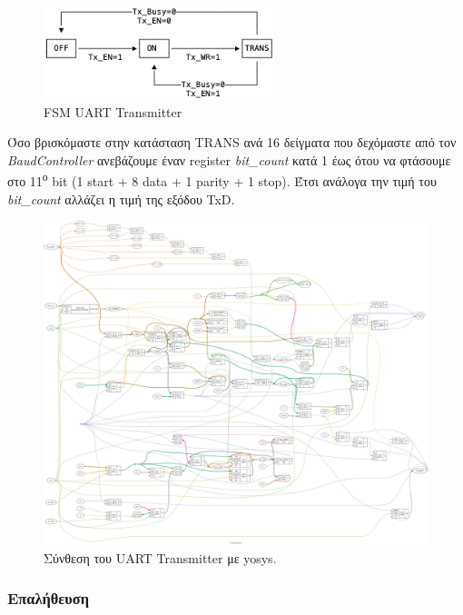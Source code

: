 \documentclass[../main.tex]{subfiles}
\begin{document}
\begin{figure}[H]
  \begin{center}
    \includegraphics[width=0.6\textwidth]{../../monodraw/UartTransmitter.png}
  \end{center}
  \caption{FSM UART Transmitter}
  \label{fig:uart_transmitter_fsm}
\end{figure}

Όσο βρισκόμαστε στην κατάσταση TRANS ανά 16 δείγματα που δεχόμαστε από τον
\textit{BaudController} ανεβάζουμε έναν register \textit{bit\_count} κατά 1 έως
ότου να φτάσουμε στο 11\textsuperscript{ο} bit (1 start + 8 data + 1 parity + 1
stop). Έτσι ανάλογα την τιμή του \textit{bit\_count} αλλάζει η τιμή της εξόδου
TxD.

\begin{figure}[H]
  \begin{center}
    \includegraphics[width=\textwidth]{../../diagrams/UartTransmitter.png}
  \end{center}
  \caption{Σύνθεση του UART Transmitter με yosys.}
\end{figure}

\subsubsection*{Επαλήθευση}
\end{document}
